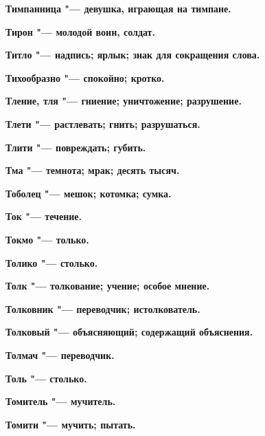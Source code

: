 \begin{multicols}{2}
\bfseries Тимпанница\normalfont{} "--- девушка, играющая на тимпане. 




\bfseries Тирон\normalfont{} "--- молодой воин, солдат. 




\bfseries Титло\normalfont{} "--- надпись; ярлык; знак для сокращения слова. 




\bfseries Тихообразно\normalfont{} "--- спокойно; кротко. 




\bfseries Тление, тля\normalfont{} "--- гниение; уничтожение; разрушение. 




\bfseries Тлети\normalfont{} "--- растлевать; гнить; разрушаться. 




\bfseries Тлити\normalfont{} "--- повреждать; губить. 




\bfseries Тма\normalfont{} "--- темнота; мрак; десять тысяч. 




\bfseries Тоболец\normalfont{} "--- мешок; котомка; сумка. 




\bfseries Ток\normalfont{} "--- течение. 




\bfseries Токмо\normalfont{} "--- только. 




\bfseries Толико\normalfont{} "--- столько. 




\bfseries Толк\normalfont{} "--- толкование; учение; особое мнение. 




\bfseries Толковник\normalfont{} "--- переводчик; истолкователь. 




\bfseries Толковый\normalfont{} "--- объясняющий; содержащий объяснения. 




\bfseries Толмач\normalfont{} "--- переводчик. 




\bfseries Толь\normalfont{} "--- столько. 




\bfseries Томитель\normalfont{} "--- мучитель. 




\bfseries Томити\normalfont{} "--- мучить; пытать. 





\end{multicols}
